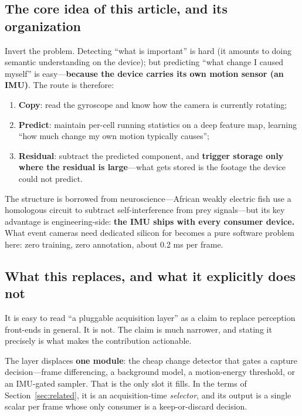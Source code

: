 \documentclass[12pt,a4paper]{article}
\begin{document}
\subsection{The core idea of this article, and its organization}

Invert the problem. Detecting ``what is important'' is hard (it amounts to doing semantic understanding on the device); but predicting ``what change I caused myself'' is easy---\textbf{because the device carries its own motion sensor (an IMU)}. The route is therefore:

\begin{enumerate}
  \item \textbf{Copy}: read the gyroscope and know how the camera is currently rotating;
  \item \textbf{Predict}: maintain per-cell running statistics on a deep feature map, learning ``how much change my own motion typically causes'';
  \item \textbf{Residual}: subtract the predicted component, and \textbf{trigger storage only where the residual is large}---what gets stored is the footage the device could not predict.
\end{enumerate}

The structure is borrowed from neuroscience---African weakly electric fish use a homologous circuit to subtract self-interference from prey signals---but its key advantage is engineering-side: \textbf{the IMU ships with every consumer device.} What event cameras need dedicated silicon for becomes a pure software problem here: zero training, zero annotation, about 0.2 ms per frame.

\subsection{What this replaces, and what it explicitly does not}
\label{sec:scope-intro}

It is easy to read ``a pluggable acquisition layer'' as a claim to replace perception front-ends in general. It is not. The claim is much narrower, and stating it precisely is what makes the contribution actionable.

The layer displaces \textbf{one module}: the cheap change detector that gates a capture decision---frame differencing, a background model, a motion-energy threshold, or an IMU-gated sampler. That is the only slot it fills. In the terms of Section~\ref{sec:related}, it is an acquisition-time \emph{selector}, and its output is a single scalar per frame whose only consumer is a keep-or-discard decision.
\end{document}
